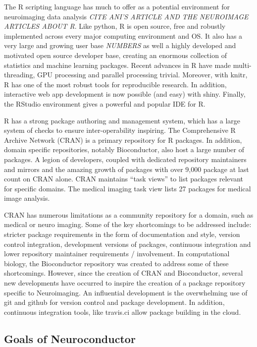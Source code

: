 \documentclass[]{elsarticle} %
\begin{document}
The R scripting language has much to offer as a potential environment
for neuroimaging data analysis \emph{CITE ANI'S ARTICLE AND THE
NEUROIMAGE ARTICLES ABOUT R}. Like python, R is open source, free and
robustly implemented across every major computing environment and OS. It
also has a very large and growing user base \emph{NUMBERS} as well a
highly developed and motivated open source developer base, creating an
enormous collection of statistics and machine learning packages. Recent
advances in R have made multi-threading, GPU processing and parallel
processing trivial. Moreover, with knitr, R has one of the most robust
tools for reproducible research. In addition, interactive web app
development is now possible (and easy) with shiny. Finally, the RStudio
environment gives a powerful and popular IDE for R.

R has a strong package authoring and management system, which has a
large system of checks to ensure inter-operability inspiring. The
Comprehensive R Archive Network (CRAN) is a primary repository for R
packages. In addition, domain specific repositories, notably
Bioconductor, also host a large number of packages. A legion of
developers, coupled with dedicated repository maintainers and mirrors
and the amazing growth of packages with over 9,000 package at last count
on CRAN alone. CRAN maintains ``task views'' to list packages relevant
for specific domains. The medical imaging task view lists 27 packages
for medical image analysis.

CRAN has numerous limitations as a community repository for a domain,
such as medical or neuro imaging. Some of the key shortcomings to be
addressed include: stricter package requirements in the form of
documentation and style, version control integration, development
versions of packages, continuous integration and lower repository
maintainer requirements / involvement. In computational biology, the
Bioconductor repository was created to address some of these
shortcomings. However, since the creation of CRAN and Bioconductor,
several new developments have occurred to inspire the creation of a
package repository specific to Neuroimaging. An influential development
is the overwhelming use of git and github for version control and
package development. In addition, continuous integration tools, like
travis.ci allow package building in the cloud.

\subsection{Goals of Neuroconductor}\label{goals-of-neuroconductor}
\end{document}
